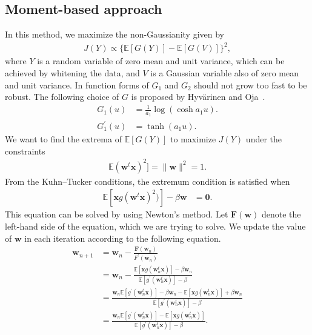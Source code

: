\documentclass[aps,prl,preprint,superscriptaddress]{revtex4-2}
\begin{document}
\subsection{Moment-based approach}
In this method, we maximize the non-Gaussianity given by
\begin{align}
J(Y) \propto \{\mathbb{E}[G(Y)] - \mathbb{E}[G(V)]\}^2,
\end{align}
where $Y$ is a random variable of zero mean and unit variance, which can be achieved by whitening the data, and $V$ is a Gaussian variable also of zero mean and unit variance. In function forms of $G_1$ and $G_2$ should not grow too fast to be robust. The following choice of $G$ is proposed by Hyvärinen and Oja~\cite{hyvarinen2000independent}.
\begin{align}
G_1(u) &= \frac{1}{a_1} \log (\cosh a_1 u). \\
G_1^{\prime}(u) &= \tanh(a_1 u).
\end{align}
We want to find the extrema of $\mathbb{E}[G(Y)]$ to maximize $J(Y)$ under the constraints
\begin{align}
\mathbb{E}(\mathbf{w}^{t}\mathbf{x})^2] = \| \mathbf{w}\|^2 = 1.
\end{align}
From the Kuhn--Tucker conditions, the extremum condition is satisfied when
\begin{align}
\mathbb{E}[\mathbf{x}g(\mathbf{w}^{t}\mathbf{x})^2)] - \beta\mathbf{w} &= \mathbf{0}.
\end{align}
This equation can be solved by using Newton's method.
Let $\mathbf{F}(\mathbf{w})$ denote the left-hand side of the equation, which we are trying to solve.
We update the value of $\mathbf{w}$ in each iteration according to the following equation.
\begin{align}
\mathbf{w}_{n+1} &= \mathbf{w}_n - \frac{\mathbf{F}(\mathbf{w}_n)}{F^{\prime}(\mathbf{w}_n)} \\
&= \mathbf{w}_n - \frac{\mathbb{E}[\mathbf{x}g(\mathbf{w}_n^t\mathbf{x})] - \beta \mathbf{w}_n}{\mathbb{E}[g^{\prime}(\mathbf{w}_n^t\mathbf{x})] - \beta} \\
&= \frac{\mathbf{w}_n\mathbb{E}[g^{\prime}(\mathbf{w}_n^t\mathbf{x})] - \beta\mathbf{w}_n - \mathbb{E}[\mathbf{x}g(\mathbf{w}_n^t\mathbf{x})] + \beta\mathbf{w}_n}{\mathbb{E}[g^{\prime}(\mathbf{w}_n^t\mathbf{x})] - \beta} \\
&= \frac{\mathbf{w}_n\mathbb{E}[g^{\prime}(\mathbf{w}_n^t\mathbf{x})] - \mathbb{E}[\mathbf{x}g(\mathbf{w}_n^t\mathbf{x})]}{\mathbb{E}[g^{\prime}(\mathbf{w}_n^t\mathbf{x})] - \beta}.
\end{align}
\end{document}
